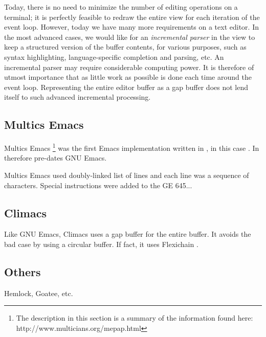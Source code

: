 Today, there is no need to minimize the number of editing operations
on a terminal; it is perfectly feasible to redraw the entire view for
each iteration of the event loop.  However, today we have many more
requirements on a text editor.  In the most advanced cases, we would
like for an \emph{incremental parser} in the view to keep a structured
version of the buffer contents, for various purposes, such as syntax
highlighting, language-specific completion and parsing, etc.  An
incremental parser may require considerable computing power.  It is
therefore of utmost importance that as little work as possible is done
each time around the event loop.  Representing the entire editor
buffer as a gap buffer does not lend itself to such advanced
incremental processing.

\subsection{Multics Emacs}


Multics Emacs%
\footnote{The description in this section is a summary of the
  information found here: http://www.multicians.org/mepap.html}
was the first Emacs implementation written in \lisp{}, in this case
\multics{} \maclisp{}.  In therefore pre-dates GNU Emacs.

Multics Emacs used doubly-linked list of lines and each line was a
sequence of characters.  Special instructions were added to the GE
645...

\subsection{Climacs}

Like GNU Emacs, Climacs uses a gap buffer for the entire buffer.  It
avoids the bad case by using a circular buffer.  If fact, it uses
Flexichain \cite{flexichain}.

\subsection{Others}

Hemlock, Goatee, etc.

